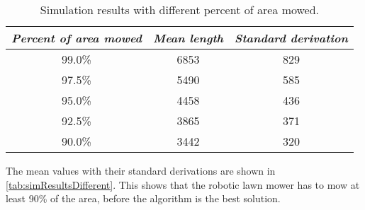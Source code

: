 \begin{table}[htb]
\centering
\caption{Simulation results with different percent of area mowed.}
\label{tab:simResultsDifferent}
\begin{tabular}{c c c}
\textit{Percent of area mowed} & \textit{Mean length} & \textit{Standard derivation}\\ \toprule 
\rowcolor{lightGrey} 99.0\% & 6853 & 829\\
97.5\% & 5490 & 585\\
\rowcolor{lightGrey} 95.0\% & 4458 & 436\\
92.5\% & 3865 & 371\\
\rowcolor{lightGrey} 90.0\% & 3442 & 320\\
\end{tabular}
\end{table}
The mean values with their standard derivations are shown in \autoref{tab:simResultsDifferent}. This shows that the robotic lawn mower has to mow at least 90\% of the area, before the algorithm is the best solution.



